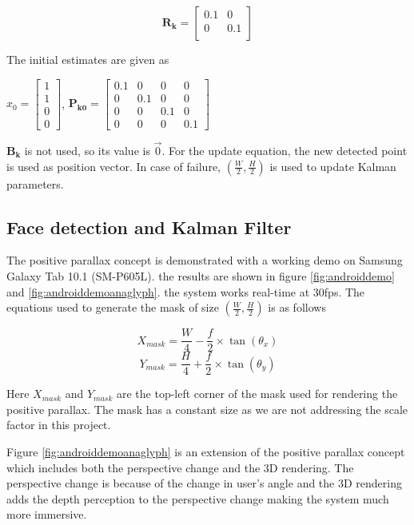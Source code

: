 \documentclass[12pt,twocolumn,letterpaper]{article}
\begin{document}
$$ \mathbf{R_k} = \begin{bmatrix}
0.1 & 0 \\
0 & 0.1\\
\end{bmatrix} $$

The initial estimates are given as

$ \hat{x}_{0} = \begin{bmatrix}
1\\1\\0\\0
\end{bmatrix} $,
$ \mathbf{P_{k0}} = \begin{bmatrix}
0.1 & 0 & 0 & 0\\
0 & 0.1 & 0 & 0\\
0 & 0 & 0.1 & 0\\
0 & 0 & 0 & 0.1
\end{bmatrix} $

$\mathbf{B_k}$ is not used, so its value is $\vec{0}$. For the update equation, the new detected point is used as position vector. In case of failure, $(\frac{W}{2}, \frac{H}{2})$ is used to update Kalman parameters.

\subsection{Face detection and Kalman Filter}
The positive parallax concept is demonstrated with a working demo on Samsung Galaxy Tab 10.1 (SM-P605L). the results are shown in figure \ref{fig:androiddemo} and \ref{fig:androiddemoanaglyph}. the system works real-time at 30fps. The equations used to generate the mask of size $(\frac{W}{2}, \frac{H}{2})$ is as follows

\begin{equation}
	X_{mask} = \frac{W}{4} - \frac{f}{2} \times \tan(\theta_x)
\end{equation}
\begin{equation}
	Y_{mask} = \frac{H}{4} + \frac{f}{2} \times \tan(\theta_y)
\end{equation}

Here $X_{mask}$ and $Y_{mask}$ are the top-left corner of the mask used for rendering the positive parallax. The mask has a constant size as we are not addressing the scale factor in this project.

Figure \ref{fig:androiddemoanaglyph} is an extension of the positive parallax concept which includes both the perspective change and the 3D rendering. The perspective change is because of the change in user's angle and the 3D rendering adds the depth perception to the perspective change making the system much more immersive. 
\end{document}
